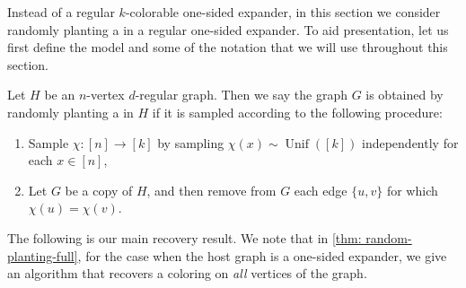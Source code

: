 Instead of a regular $k$-colorable one-sided expander, in this section we consider randomly planting a \kcl in a regular one-sided expander.
To aid presentation, let us first define the model and some of the notation that we will use throughout this section.

\begin{definition} \label{def: randomplanted}
Let $H$ be an $n$-vertex $d$-regular graph. 
Then we say the graph $G$ is obtained by randomly planting a \kcl in $H$ if it is sampled according to the following procedure:
\begin{enumerate}
    \item Sample $\chi: [n] \to [k]$ by sampling $\chi(x) \sim \operatorname{Unif}([k])$ independently for each $x \in [n]$,
    \item Let $G$ be a copy of $H$, and then remove from $G$ each edge $\{u,v\}$ for which $\chi(u) = \chi(v)$.
\end{enumerate}
\end{definition}


The following is our main recovery result.
We note that in \cref{thm: random-planting-full}, for the case when the host graph is a one-sided expander, we give an algorithm that recovers a coloring on \emph{all} vertices of the graph.

